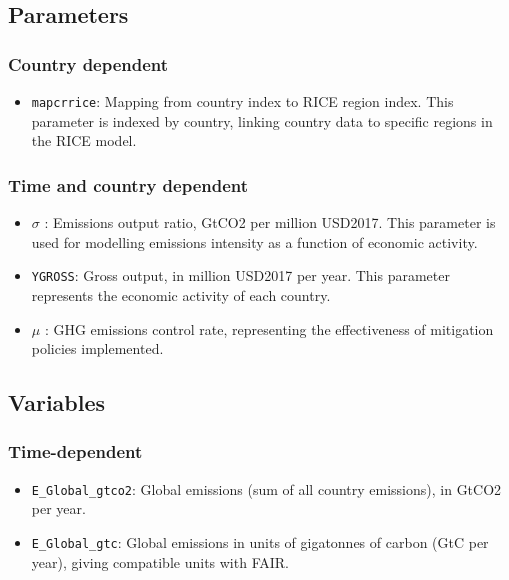 \documentclass[
]{article}
\providecommand{\tightlist}{%
  \setlength{\itemsep}{0pt}\setlength{\parskip}{0pt}}
\begin{document}
\subsection{Parameters}\label{parameters-2}

\subsubsection{Country dependent}\label{country-dependent}

\begin{itemize}
\tightlist
\item
  \texttt{mapcrrice}: Mapping from country index to RICE region index.
  This parameter is indexed by country, linking country data to specific
  regions in the RICE model.
\end{itemize}

\subsubsection{Time and country
dependent}\label{time-and-country-dependent-4}

\begin{itemize}
\item
  \(\sigma\) : Emissions output ratio, GtCO2 per million USD2017. This
  parameter is used for modelling emissions intensity as a function of
  economic activity.
\item
  \texttt{YGROSS}: Gross output, in million USD2017 per year. This
  parameter represents the economic activity of each country.
\item
  \(\mu\) : GHG emissions control rate, representing the effectiveness
  of mitigation policies implemented.
\end{itemize}

\subsection{Variables}\label{variables-2}

\subsubsection{Time-dependent}\label{time-dependent-3}

\begin{itemize}
\item
  \texttt{E\_Global\_gtco2}: Global emissions (sum of all country
  emissions), in GtCO2 per year.
\item
  \texttt{E\_Global\_gtc}: Global emissions in units of gigatonnes of
  carbon (GtC per year), giving compatible units with FAIR.
\end{itemize}
\end{document}
